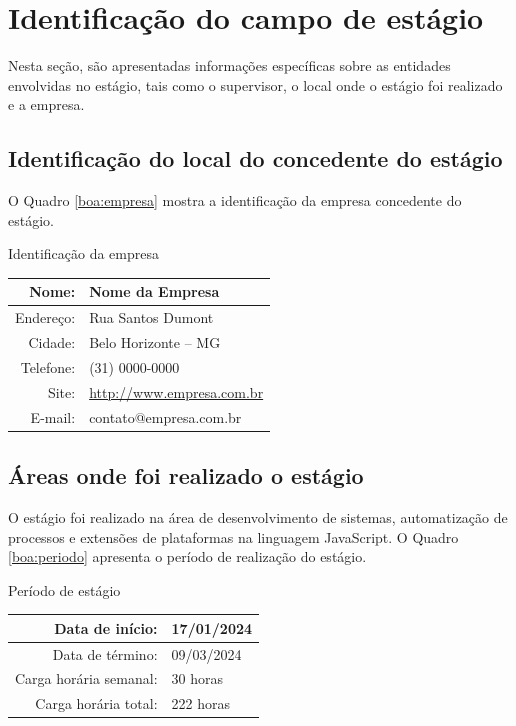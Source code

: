 \documentclass[estagio]{iftex2024}
\begin{document}
\section{Identificação do campo de estágio}

Nesta seção, são apresentadas informações específicas sobre as entidades envolvidas no estágio, tais como o supervisor, o local onde o estágio foi realizado e a empresa.

\subsection{Identificação do local do concedente do estágio}

O Quadro \ref{boa:empresa} mostra a identificação da empresa concedente do estágio.

\begin{board}[!htb] \centering
\caption{Identificação da empresa} \label{boa:empresa}
\begin{varwidth}{\linewidth}
  \begin{tabular}{|r|l|} \hline
  Nome:           & Nome da Empresa                  \\ \hline
  Endereço:       & Rua Santos Dumont                 \\ \hline
  Cidade:         & Belo Horizonte -- MG              \\ \hline
  Telefone:       & (31) 0000-0000                   \\ \hline
  Site:           & \url{http://www.empresa.com.br}  \\ \hline
  E-mail:         & contato@empresa.com.br           \\ \hline
  \end{tabular}
\end{varwidth}
\end{board}

\subsection{Áreas onde foi realizado o estágio}

O estágio foi realizado na área de desenvolvimento de sistemas, automatização de processos e extensões de plataformas na linguagem JavaScript.
O Quadro \ref{boa:periodo} apresenta o período de realização do estágio.

\begin{board}[!htb] \centering
\caption{Período de estágio} \label{boa:periodo}
\begin{varwidth}{\linewidth}
  \begin{tabular}{|r|l|} \hline
  Data de início:        & 17/01/2024 \\ \hline
  Data de término:       & 09/03/2024 \\ \hline
  Carga horária semanal: & 30 horas   \\ \hline
  Carga horária total:   & 222 horas  \\ \hline
  \end{tabular}
\end{varwidth}
\end{board}
\end{document}
